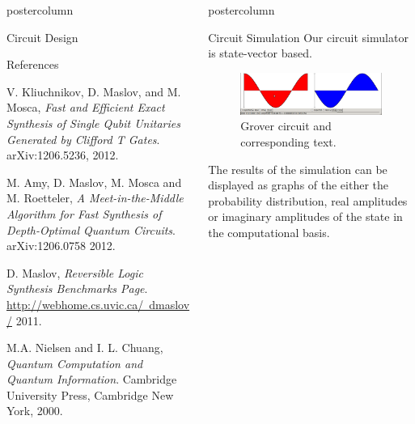 \documentclass[final]{beamer} %
\begin{document}
\begin{frame}{}
\begin{columns}
\begin{column}{.33\textwidth}
\begin{beamercolorbox}[center,wd=\textwidth]{postercolumn}
\begin{minipage}[T]{.95\textwidth}
\begin{block}{\large Circuit Design}
           \end{block}

           \begin{block}{\large References}
		\begin{thebibliography}{9}
\small{
  		V. Kliuchnikov, D. Maslov, and M. Mosca,
  		\emph{Fast and Efficient Exact Synthesis of Single Qubit Unitaries Generated by Clifford T Gates}.
  		arXiv:1206.5236,
  		2012.

  		M. Amy, D. Maslov, M. Mosca and M. Roetteler,
  		\emph{A Meet-in-the-Middle Algorithm for Fast Synthesis of Depth-Optimal Quantum Circuits}.
  		arXiv:1206.0758
  		2012.

  		D. Maslov,
  		\emph{Reversible Logic Synthesis Benchmarks Page}.
  		\href{http://webhome.cs.uvic.ca/~dmaslov/}{http://webhome.cs.uvic.ca/~dmaslov/}
  		2011.

  		M.A. Nielsen and I. L. Chuang, 
  		\emph{Quantum Computation and Quantum Information}.
  		Cambridge University Press,
		Cambridge New York,
  		2000.
}
		\end{thebibliography}
           \end{block}

         \end{minipage}
      \end{beamercolorbox}
    \end{column}

    \begin{column}{.33\textwidth}
      \begin{beamercolorbox}[center,wd=\textwidth]{postercolumn}
         \begin{minipage}[T]{.95\textwidth}
           \begin{block}{\large Circuit Simulation}
              Our circuit simulator is state-vector based.

                    \centering 
		\begin{figure}[!htbp]
		  \centering
		  \includegraphics{figures/state.png}
		  \caption{Grover circuit and corresponding text.}
		\end{figure}
      The results of the simulation can be displayed as graphs of the either the probability distribution, real amplitudes or imaginary amplitudes of the state in the computational basis.


\end{block}
\end{minipage}
\end{beamercolorbox}
\end{column}
\end{columns}
\end{frame}
\end{document}
